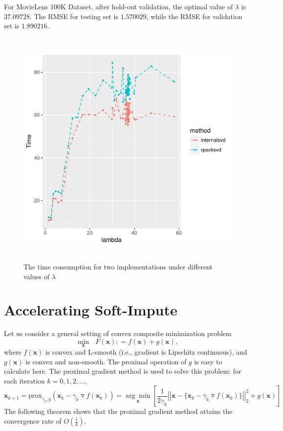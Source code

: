 \documentclass[12pt]{article}
\begin{document}
For MovieLens 100K Dataset, after hold-out validation, the optimal value of $\lambda$ is $37.09728$. The RMSE for testing set is $1.570029$, while the RMSE for validation set is $1.890216$.


\begin{figure}[H]
	\includegraphics[width=18cm,height=12cm]{speed}
	\caption{The time consumption for two implementations under different values of $\lambda$}\label{speed}
\end{figure}

\vspace{0.2in}
\section{Accelerating \textbf{Soft-Impute}}
Let us consider a general setting of convex composite minimization problem
\begin{equation*}
\underset{\bm{x}}{\min}\text{ }F(\bm{x}) ;= f(\bm{x}) + g(\bm{x}),
\end{equation*}
where $f(\bm{x})$ is convex and L-smooth (i.e., gradient is Lipschitz continuous), and  $g(\bm{x})$ is convex and non-smooth. The proximal operation of $g$ is easy to calculate here.  The proximal gradient method \cite{bruck1975iterative} is used to solve this problem: for each iteration $k = 0,1,2,\ldots$,
\begin{equation*}
\bm{x}_{k+1} = \text{prox}_{\gamma_{k}, g}(\bm{x}_{k}-\gamma_{k}\triangledown f(\bm{x}_{k})) = 
\underset{\bm{x}}{\arg\min}\left[\frac{1}{2\gamma_{k}}\left|\left|\bm{x} - \{\bm{x}_{k}-\gamma_{k}\triangledown f(\bm{x}_{k})\}\right|\right|^{2}_{2}+g(\bm{x})\right]
\end{equation*}
The following theorem shows that the proximal gradient method attains the convergence rate of $O\left(\frac{1}{k}\right)$.
\end{document}
